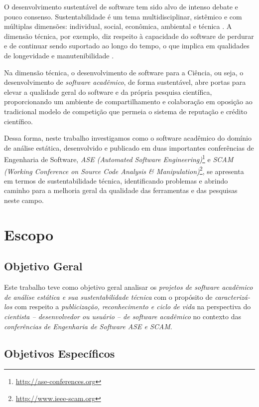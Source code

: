 O desenvolvimento sustentável de software tem sido alvo de intenso debate e
pouco consenso. Sustentabilidade é um tema multidisciplinar, sistêmico e com
múltiplas dimensões: individual, social, econômica, ambiental e técnica
\cite{becker2014karlskrona}. A dimensão técnica, por exemplo, diz respeito à
capacidade do software de perdurar e de continuar sendo suportado ao longo do
tempo, o que implica em qualidades de longevidade e manutenibilidade
\cite{venters2014software}.

Na dimensão técnica, o desenvolvimento de software para a Ciência, ou seja, o
desenvolvimento de {\it software acadêmico}, de forma sustentável, abre portas
para elevar a qualidade geral do software e da própria pesquisa científica,
proporcionando um ambiente de compartilhamento e colaboração em oposição ao
tradicional modelo de competição que permeia o sistema de reputação e crédito
científico.

Dessa forma, neste trabalho investigamos como o software acadêmico do domínio
de análise estática, desenvolvido e publicado em duas importantes conferências
de Engenharia de Software, {\it ASE (Automated Software
Engineering)}\footnote{\url{http://ase-conferences.org}} e {\it SCAM (Working
Conference on Source Code Analysis \&
Manipulation)}\footnote{\url{http://www.ieee-scam.org}}, se apresenta em termos
de sustentabilidade técnica, identificando problemas e abrindo caminho para a
melhoria geral da qualidade das ferramentas e das pesquisas neste campo.

\section{Escopo}

\subsection{Objetivo Geral}

Este trabalho teve como objetivo geral
analisar os \textit{projetos de software acadêmico de análise estática e sua sustentabilidade técnica}
com o propósito de \textit{caracterizá-los}
com respeito a \textit{publicização, reconhecimento e ciclo de vida}
na perspectiva do \textit{cientista -- desenvolvedor ou usuário -- de software acadêmico}
no contexto das \textit{conferências de Engenharia de Software ASE e SCAM}.

\subsection{Objetivos Específicos}

